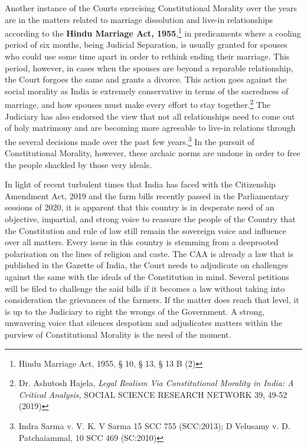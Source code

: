 \begin{multicols}{2}
\noi
Another instance of the Courts exercising Constitutional Morality over the years are in the
matters related to marriage dissolution and live-in relationships according to the \textbf{Hindu Marriage Act, 1955},\footnote{Hindu Marriage Act, 1955, § 10, § 13, § 13 B (2)} in predicaments where a cooling period of six months, being Judicial
Separation, is usually granted for spouses who could use some time apart in order to rethink
ending their marriage. This period, however, in cases when the spouses are beyond a
reparable relationship, the Court forgoes the same and grants a divorce. This action goes
against the social morality as India is extremely conservative in terms of the sacredness of
marriage, and how spouses must make every effort to stay together.\footnote{Dr. Ashutosh Hajela, \textit{Legal Realism Via Constitutional Morality in India: A Critical Analysis,} SOCIAL SCIENCE RESEARCH NETWORK 39, 49-52 (2019) } The Judiciary has also endorsed the view that not all relationships need to come out of holy matrimony and are
becoming more agreeable to live-in relations through the several decisions made over the past
few years.\footnote{Indra Sarma v. V. K. V Sarma 15 SCC 755 (SCC:2013); D Velusamy v. D. Patchaiammal, 10 SCC 469
(SC:2010)} In the pursuit of Constitutional Morality, however, these archaic norms are
undone in order to free the people shackled by those very ideals.

\noi
In light of recent turbulent times that India has faced with the Citizenship Amendment Act,
2019 and the farm bills recently passed in the Parliamentary sessions of 2020, it is apparent
that this country is in desperate need of an objective, impartial, and strong voice to reassure
the people of the Country that the Constitution and rule of law still remain the sovereign
voice and influence over all matters. Every issue in this country is stemming from a deeprooted polarisation on the lines of religion and caste. The CAA is already a law that is
published in the Gazette of India, the Court needs to adjudicate on challenges against the
same with the ideals of the Constitution in mind. Several petitions will be filed to challenge
the said bills if it becomes a law without taking into consideration the grievances of the
farmers. If the matter does reach that level, it is up to the Judiciary to right the wrongs of the
Government. A strong, unwavering voice that silences despotism and adjudicates matters
within the purview of Constitutional Morality is the need of the moment.



\end{multicols}
